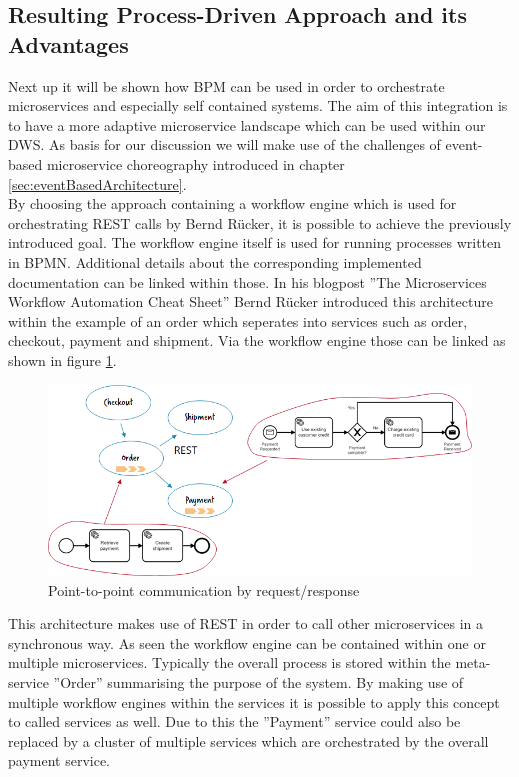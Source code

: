 \subsection{Resulting Process-Driven Approach and its Advantages}
Next up it will be shown how BPM can be used in order to orchestrate microservices and especially self contained systems. The aim of this integration is to have a more adaptive microservice landscape which can be used within our DWS. As basis for our discussion we will make use of the challenges of event-based microservice choreography introduced in chapter \ref{sec:eventBasedArchitecture}.\newline
\\
By choosing the approach containing a workflow engine which is used for orchestrating REST calls by Bernd Rücker, it is possible to achieve the previously introduced goal. The workflow engine itself is used for running processes written in BPMN. Additional details about the corresponding implemented documentation can be linked within those.\newline
In his blogpost ''The Microservices Workflow Automation Cheat Sheet'' Bernd Rücker introduced this architecture within the example of an order which seperates into services such as order, checkout, payment and shipment. Via the workflow engine those can be linked as shown in figure \ref{fig:RestArchitecture}. \cite{orchestrationMicroServices}\newline
\begin{figure}[!htb]
    \centering
    \includegraphics[scale=0.65]{pictures/RestArchitecture.png}
    \caption{Point-to-point communication by request/response \cite{orchestrationMicroServices}}
    \label{fig:RestArchitecture}
\end{figure}
This architecture makes use of REST in order to call other microservices in a synchronous way. As seen the workflow engine can be contained within one or multiple microservices. \cite{orchestrationMicroServices} Typically the overall process is stored within the meta-service ''Order'' summarising the purpose of the system. By making use of multiple workflow engines within the services it is possible to apply this concept to called services as well. Due to this the ''Payment'' service could also be replaced by a cluster of multiple services which are orchestrated by the overall payment service.\newline
